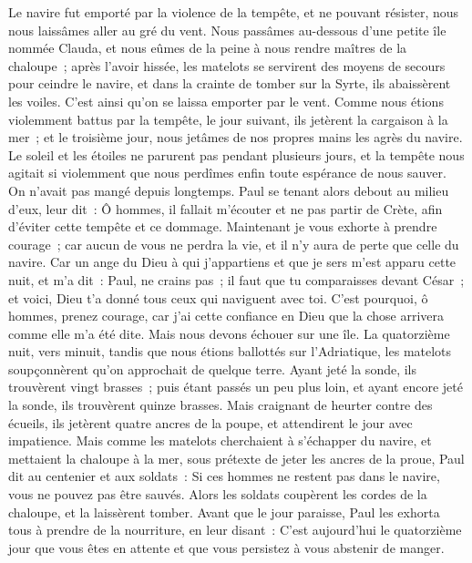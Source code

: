 \begin{multicols}{2}
Le navire fut emporté par la violence de la tempête, et ne pouvant résister, nous nous laissâmes aller au gré du vent.
Nous passâmes au-dessous d'une petite île nommée Clauda, et nous eûmes de la peine à nous rendre maîtres de la chaloupe~;
après l'avoir hissée, les matelots se servirent des moyens de secours pour ceindre le navire, et dans la crainte de tomber sur la Syrte, ils abaissèrent les voiles. C'est ainsi qu'on se laissa emporter par le vent.
Comme nous étions violemment battus par la tempête, le jour suivant, ils jetèrent la cargaison à la mer~;
et le troisième jour, nous jetâmes de nos propres mains les agrès du navire.
Le soleil et les étoiles ne parurent pas pendant plusieurs jours, et la tempête nous agitait si violemment que nous perdîmes enfin toute espérance de nous sauver.
On n'avait pas mangé depuis longtemps. Paul se tenant alors debout au milieu d'eux, leur dit~: Ô hommes, il fallait m'écouter et ne pas partir de Crète, afin d'éviter cette tempête et ce dommage.
Maintenant je vous exhorte à prendre courage~; car aucun de vous ne perdra la vie, et il n'y aura de perte que celle du navire.
Car un ange du Dieu à qui j'appartiens et que je sers m'est apparu cette nuit,
et m'a dit~: Paul, ne crains pas~; il faut que tu comparaisses devant César~; et voici, Dieu t'a donné tous ceux qui naviguent avec toi.
C'est pourquoi, ô hommes, prenez courage, car j'ai cette confiance en Dieu que la chose arrivera comme elle m'a été dite.
Mais nous devons échouer sur une île.
La quatorzième nuit, vers minuit, tandis que nous étions ballottés sur l'Adriatique, les matelots soupçonnèrent qu'on approchait de quelque terre.
Ayant jeté la sonde, ils trouvèrent vingt brasses~; puis étant passés un peu plus loin, et ayant encore jeté la sonde, ils trouvèrent quinze brasses.
Mais craignant de heurter contre des écueils, ils jetèrent quatre ancres de la poupe, et attendirent le jour avec impatience.
Mais comme les matelots cherchaient à s'échapper du navire, et mettaient la chaloupe à la mer, sous prétexte de jeter les ancres de la proue,
Paul dit au centenier et aux soldats~: Si ces hommes ne restent pas dans le navire, vous ne pouvez pas être sauvés.
Alors les soldats coupèrent les cordes de la chaloupe, et la laissèrent tomber.
Avant que le jour paraisse, Paul les exhorta tous à prendre de la nourriture, en leur disant~: C'est aujourd'hui le quatorzième jour que vous êtes en attente et que vous persistez à vous abstenir de manger.

\end{multicols}

